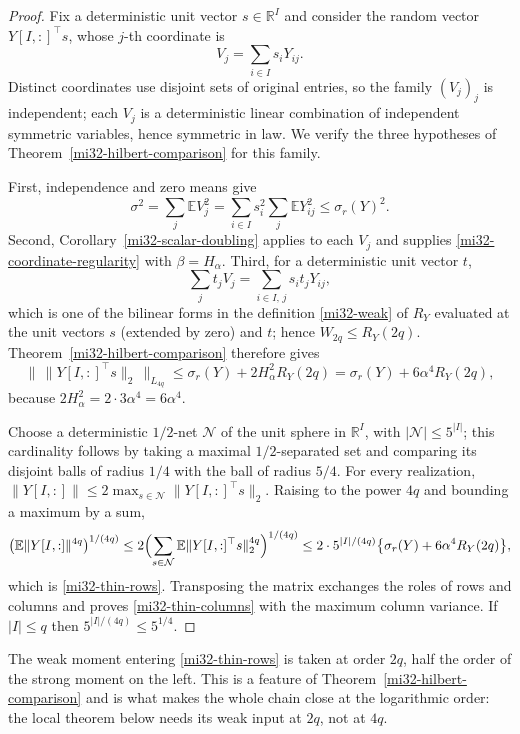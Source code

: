 \documentclass[11pt]{article}
\theoremstyle{definition}
\theoremstyle{remark}
\newcommand{\R}{\mathbb R}
\newcommand{\E}{\mathbb E}
\newcommand{\norm}[1]{\lVert#1\rVert}
\begin{document}
\begin{proof}
Fix a deterministic unit vector $s\in\R^I$ and consider the random
vector $Y[I,:]^\top s$, whose $j$-th coordinate is
\[
 V_j=\sum_{i\in I}s_iY_{ij}.
\]
Distinct coordinates use disjoint sets of original entries, so the
family $(V_j)_j$ is independent; each $V_j$ is a deterministic linear
combination of independent symmetric variables, hence symmetric in law.
We verify the three hypotheses of
Theorem~\ref{mi32-hilbert-comparison} for this family.

First, independence and zero means give
\begin{equation}\label{mi32-fixed-vector-variance}
 \sigma^2=\sum_j\E V_j^2
   =\sum_{i\in I}s_i^2\sum_j\E Y_{ij}^2
   \le\sigma_r(Y)^2 .
\end{equation}
Second, Corollary~\ref{mi32-scalar-doubling} applies to each $V_j$ and
supplies \eqref{mi32-coordinate-regularity} with
$\beta=H_\alpha$. Third, for a deterministic unit vector $t$,
\[
 \sum_jt_jV_j=\sum_{i\in I,\,j}s_it_jY_{ij},
\]
which is one of the bilinear forms in the definition
\eqref{mi32-weak} of $R_Y$ evaluated at the unit vectors
$s$ (extended by zero) and $t$; hence $W_{2q}\le R_Y(2q)$.
Theorem~\ref{mi32-hilbert-comparison} therefore gives
\begin{equation}\label{mi32-fixed-vector-strong}
 \bigl\|\,\norm{Y[I,:]^\top s}_2\,\bigr\|_{L_{4q}}
 \le\sigma_r(Y)+2H_\alpha^2R_Y(2q)
  =\sigma_r(Y)+6\alpha^4R_Y(2q),
\end{equation}
because $2H_\alpha^2=2\cdot3\alpha^4=6\alpha^4$.

Choose a deterministic $1/2$-net $\mathcal N$ of the unit sphere in
$\R^I$, with $|\mathcal N|\le5^{|I|}$; this cardinality follows by
taking a maximal $1/2$-separated set and comparing its disjoint balls
of radius $1/4$ with the ball of radius $5/4$. For every realization,
$\norm{Y[I,:]}\le2\max_{s\in\mathcal N}\norm{Y[I,:]^\top s}_2$.
Raising to the power $4q$ and bounding a maximum by a sum,
\[
 \bigl(\E\norm{Y[I,:]}^{4q}\bigr)^{1/(4q)}
 \le2\Bigl(\sum_{s\in\mathcal N}
        \E\norm{Y[I,:]^\top s}_2^{4q}\Bigr)^{1/(4q)}
 \le2\cdot5^{|I|/(4q)}
        \bigl\{\sigma_r(Y)+6\alpha^4R_Y(2q)\bigr\},
\]
which is \eqref{mi32-thin-rows}. Transposing the matrix exchanges the
roles of rows and columns and proves \eqref{mi32-thin-columns} with the
maximum column variance. If $|I|\le q$ then $5^{|I|/(4q)}\le5^{1/4}$.
\end{proof}

The weak moment entering \eqref{mi32-thin-rows} is taken at order
$2q$, half the order of the strong moment on the left. This is a feature
of Theorem~\ref{mi32-hilbert-comparison} and is what makes the whole
chain close at the logarithmic order: the local theorem below needs its
weak input at $2q$, not at $4q$.
\end{document}

